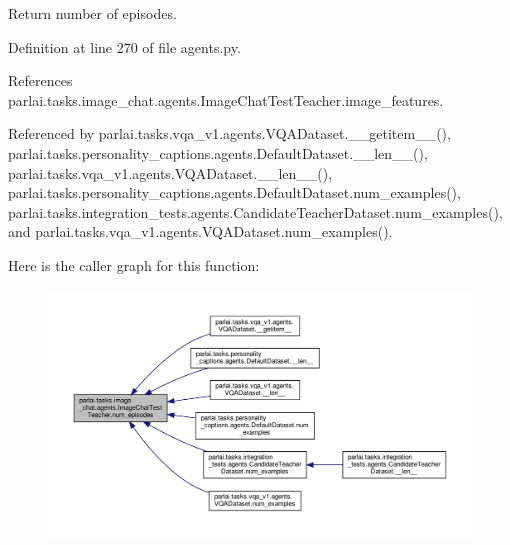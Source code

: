\begin{DoxyVerb}Return number of episodes.\end{DoxyVerb}
 

Definition at line 270 of file agents.\+py.



References parlai.\+tasks.\+image\+\_\+chat.\+agents.\+Image\+Chat\+Test\+Teacher.\+image\+\_\+features.



Referenced by parlai.\+tasks.\+vqa\+\_\+v1.\+agents.\+V\+Q\+A\+Dataset.\+\_\+\+\_\+getitem\+\_\+\+\_\+(), parlai.\+tasks.\+personality\+\_\+captions.\+agents.\+Default\+Dataset.\+\_\+\+\_\+len\+\_\+\+\_\+(), parlai.\+tasks.\+vqa\+\_\+v1.\+agents.\+V\+Q\+A\+Dataset.\+\_\+\+\_\+len\+\_\+\+\_\+(), parlai.\+tasks.\+personality\+\_\+captions.\+agents.\+Default\+Dataset.\+num\+\_\+examples(), parlai.\+tasks.\+integration\+\_\+tests.\+agents.\+Candidate\+Teacher\+Dataset.\+num\+\_\+examples(), and parlai.\+tasks.\+vqa\+\_\+v1.\+agents.\+V\+Q\+A\+Dataset.\+num\+\_\+examples().

Here is the caller graph for this function\+:
\nopagebreak
\begin{figure}[H]
\begin{center}
\leavevmode
\includegraphics[width=350pt]{classparlai_1_1tasks_1_1image__chat_1_1agents_1_1ImageChatTestTeacher_a538e34213530b244b4cc4e8c90de7af2_icgraph}
\end{center}
\end{figure}
\mbox{\label{classparlai_1_1tasks_1_1image__chat_1_1agents_1_1ImageChatTestTeacher_a5e5478cfc559bafed513c2421da53662}} 
